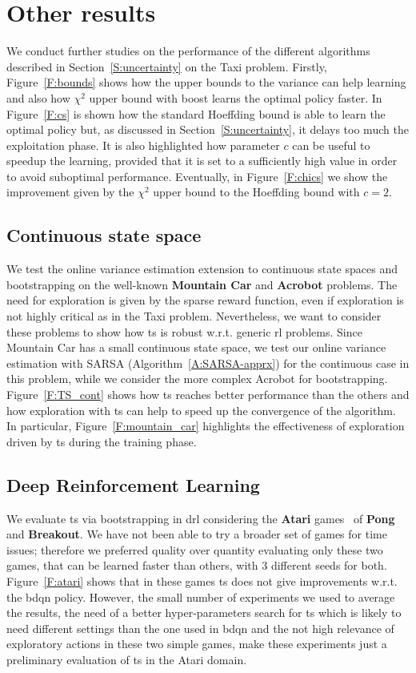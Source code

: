 \section{Other results}\label{A:results}
We conduct further studies on the performance of the different algorithms described in Section~\ref{S:uncertainty} on the Taxi problem. Firstly, Figure~\ref{F:bounds} shows how the upper bounds to the variance can help learning and also how $\chi^2$ upper bound with boost learns the optimal policy faster. In Figure~\ref{F:cs} is shown how the standard Hoeffding bound is able to learn the optimal policy but, as discussed in Section~\ref{S:uncertainty}, it delays too much the exploitation phase. It is also highlighted how parameter $c$ can be useful to speedup the learning, provided that it is set to a sufficiently high value in order to avoid suboptimal performance. Eventually, in Figure~\ref{F:chics} we show the improvement given by the $\chi^2$ upper bound to the Hoeffding bound with $c = 2$.

\subsection{Continuous state space}
We test the online variance estimation extension to continuous state spaces and bootstrapping on the well-known \textbf{Mountain Car} and \textbf{Acrobot} problems. The need for exploration is given by the sparse reward function, even if exploration is not highly critical as in the Taxi problem. Nevertheless, we want to consider these problems to show how \gls{ts} is robust w.r.t. generic \gls{rl} problems. Since Mountain Car has a small continuous state space, we test our online variance estimation with SARSA (Algorithm~\ref{A:SARSA-apprx}) for the continuous case in this problem, while we consider the more complex Acrobot for bootstrapping. Figure~\ref{F:TS_cont} shows how \gls{ts} reaches better performance than the others and how exploration with \gls{ts} can help to speed up the convergence of the algorithm. In particular, Figure~\ref{F:mountain_car} highlights the effectiveness of exploration driven by \gls{ts} during the training phase.

\subsection{Deep Reinforcement Learning}
We evaluate \gls{ts} via bootstrapping in \gls{drl} considering the \textbf{Atari} games~\cite{bellemare13arcade} of \textbf{Pong} and \textbf{Breakout}. 
We have not been able to try a broader set of games for time issues; therefore we preferred quality over quantity evaluating only these two games, that can be learned faster than others, with $3$ different seeds for both. Figure~\ref{F:atari} shows that in these games \gls{ts} does not give improvements w.r.t. the \gls{bdqn} policy. However, the small number of experiments we used to average the results, the need of a better hyper-parameters search for \gls{ts} which is likely to need different settings than the one used in \gls{bdqn} and the not high relevance of exploratory actions in these two simple games, make these experiments just a preliminary evaluation of \gls{ts} in the Atari domain.
